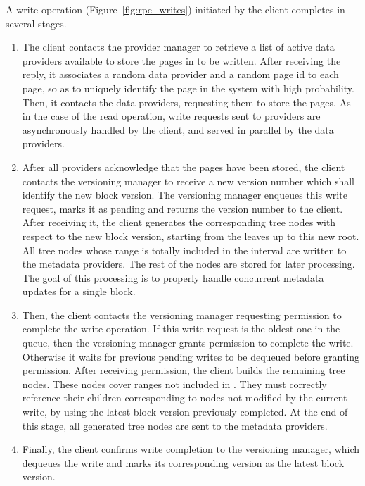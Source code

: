 \documentclass{llncs}
\begin{document}
A write operation (Figure~\ref{fig:rpc_writes}) initiated by the client completes in
several stages.
\begin{enumerate}
\item
The client contacts the provider manager to retrieve a list of active data
providers available to store the pages in  to be
written. 
After receiving the reply, it associates a random data
provider and a random page id to each page, so as to uniquely 
identify the page in the
system with high probability. Then, it contacts the data providers,
requesting them to store the pages. 
As in the case of the read operation, write
requests sent to providers are asynchronously handled by the client,
and served in parallel by the data providers.

\item
After all providers acknowledge that the pages have been stored, 
the client contacts the versioning manager to
receive a new version number which shall identify the new block version. The
versioning manager enqueues this write request, marks it as pending
and returns the version number to the client. After receiving it,
the client generates the corresponding tree nodes with respect to the
new block version, starting from the leaves up to this new root.  All
tree nodes whose range is totally included in the interval  are written to the metadata providers. The rest of the
nodes are stored for later processing. The goal of this processing is
to properly handle concurrent metadata updates for a single block.

\item 
Then, the client contacts the versioning
manager requesting permission to complete the write operation. If this
write request is the oldest one in the queue, then the versioning manager
grants permission to complete the write. Otherwise it waits
for previous pending writes to be dequeued before granting
permission. After receiving permission, the client builds the
remaining tree nodes. These nodes cover ranges not included in
. They must correctly reference their children
corresponding to nodes not modified by the current write, by using the
latest block version previously completed. At the end of this stage,
all generated tree nodes are sent to the metadata providers.

\item
Finally, the client confirms write completion to the versioning
manager, which dequeues the write and marks its corresponding version
as the latest block version.

\end{enumerate}
\end{document}
